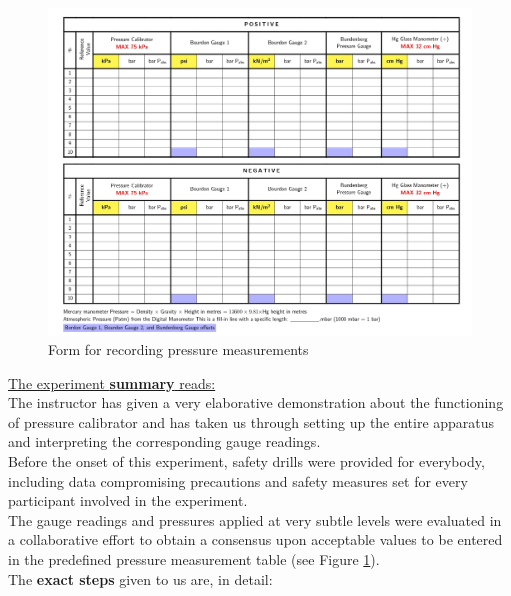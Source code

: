 \documentclass{article}
\begin{document}
	\begin{figure}[H] 
			\centering 
			\includegraphics[width=1\textwidth,cfbox=gray!15 1pt]{images/tableland-1_page-0001.jpg} 
			\caption{Form for recording pressure measurements} 
			\label{fig:pressurestable} 
	\end{figure}
	\underline{The experiment \textbf{summary} reads:}\\[1em]
	The instructor has given a very elaborative demonstration about the functioning of pressure calibrator and has taken us through setting up the entire apparatus and interpreting the corresponding gauge readings.\\[1em]
	Before the onset of this experiment, safety drills were provided for everybody, including data compromising precautions and safety measures set for every participant involved in the experiment.\\[1em]
	The gauge readings and pressures applied at very subtle levels were evaluated in a collaborative effort to obtain a consensus upon acceptable values to be entered in the predefined pressure measurement table (see Figure \ref{fig:pressurestable}).\\[1em]
	The \textbf{exact steps} given to us are, in detail:
\end{document}
